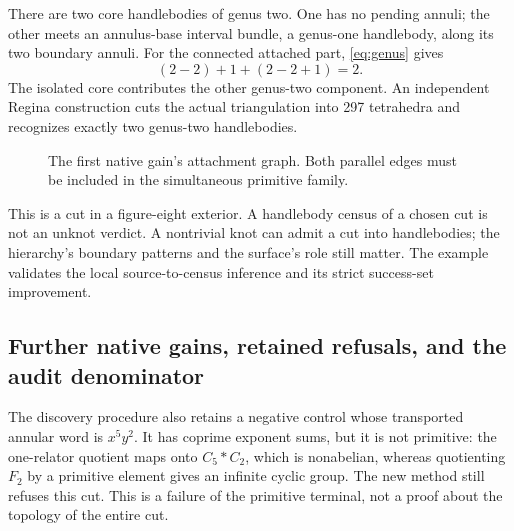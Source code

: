 \documentclass[11pt,a4paper]{article}
\theoremstyle{definition}
\theoremstyle{remark}
\begin{document}
There are two core handlebodies of genus two. One has no pending annuli;
the other meets an annulus-base interval bundle, a genus-one handlebody,
along its two boundary annuli. For the connected attached part,
\cref{eq:genus} gives
\[
 (2-2)+1+(2-2+1)=2.
\]
The isolated core contributes the other genus-two component. An independent
Regina construction cuts the actual triangulation into 297 tetrahedra and
recognizes exactly two genus-two handlebodies.

\begin{figure}[ht]
\centering
{}
\caption{The first native gain's attachment graph. Both parallel edges
must be included in the simultaneous primitive family.}
\label{fig:native}
\end{figure}

This is a cut in a figure-eight exterior. A handlebody census of a chosen
cut is not an unknot verdict. A nontrivial knot can admit a cut into
handlebodies; the hierarchy's boundary patterns and the surface's role still
matter. The example validates the local source-to-census inference and its
strict success-set improvement.

\subsection{Further native gains, retained refusals, and the audit denominator}



The discovery procedure also retains a negative control whose transported
annular word is $x^5y^2$. It has coprime exponent sums, but it is not
primitive: the one-relator quotient maps onto $C_5*C_2$, which is nonabelian,
whereas quotienting $F_2$ by a primitive element gives an infinite cyclic
group. The new method still refuses this cut. This is a failure of the
primitive terminal, not a proof about the topology of the entire cut.
\end{document}
